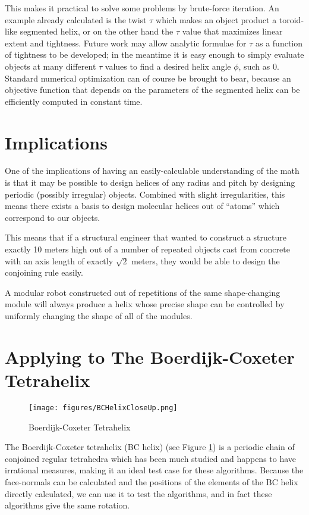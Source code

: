 \documentclass[11pt]{article}
\begin{document}
{This makes it practical to solve some problems by brute-force iteration.
An example already calculated is the twist $\tau$ which makes
an object product a toroid-like segmented helix, or on the other hand
the $\tau$ value that maximizes linear extent and tightness.
Future work may allow analytic formulae for $\tau$ as a function of
tightness to be developed; in the meantime it is easy enough
to simply evaluate objects at many different $\tau$ values to find a
desired helix angle $\phi$, such as $0$.
Standard numerical optimization can of course be brought to bear, because an objective function
that depends on the parameters of the segmented helix can
be efficiently computed in constant time.

\section{Implications}

One of the implications of having an easily-calculable understanding of the math
is that it may be possible to design helices
of any radius and pitch by designing periodic (possibly irregular) objects.
Combined with slight
irregularities, this means there exists a basis to design molecular helices
out of ``atoms'' which correspond to our objects.

This means that if a structural engineer that wanted to construct a structure exactly 10 meters high
out of a number of repeated objects cast from concrete with an axis length of  exactly $\sqrt{2}$ meters,
they would be able to design the conjoining rule easily.

A modular robot constructed out of repetitions of the same shape-changing module will always
produce a helix
whose precise shape can be controlled by uniformly changing the shape of all of the modules.

\section{Applying to The Boerdijk-Coxeter Tetrahelix}

\begin{figure}
     \centering
     \texttt{[image: figures/BCHelixCloseUp.png]}
     \caption{Boerdijk-Coxeter Tetrahelix}
  \label{fig:bchelix}
\end{figure}

The Boerdijk-Coxeter tetrahelix (BC helix) (see Figure \ref{fig:bchelix}) is a periodic chain of conjoined regular tetrahedra
which has been much studied\cite{coxeter1985simplicial,sadler2019periodic,fuller1982synergetics,read2018transforming}
and happens to have irrational measures, making it an ideal
test case for these algorithms. Because the face-normals can be calculated and the
positions of the elements of the BC helix directly calculated, we can use
it to test the algorithms, and in fact these algorithms give the same rotation.


}
\end{document}
